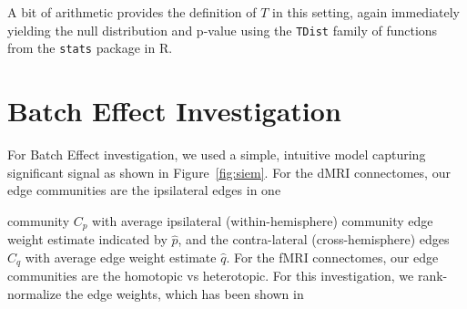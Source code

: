 \documentclass[11pt]{article}
\begin{document}
\noindent A bit of arithmetic provides the definition of $T$ in this setting, again immediately yielding the null distribution and p-value using the \texttt{TDist} family of functions from the \texttt{stats} package in R.

\section{Batch Effect Investigation}
\label{app:batch}

For Batch Effect investigation, we used a simple, intuitive model capturing significant signal as shown in Figure~\ref{fig:siem}. For the dMRI connectomes, our edge communities are the ipsilateral edges in one 

community $C_p$ with average ipsilateral (within-hemisphere) community edge weight estimate indicated by  $\hat{p}$, and the  contra-lateral (cross-hemisphere) edges $C_q$ with average edge weight estimate $\hat{q}$. For the fMRI connectomes, our edge communities are the homotopic vs heterotopic.
For this investigation, we rank-normalize the edge weights, which has been shown in \citet{discriminability}
\end{document}
